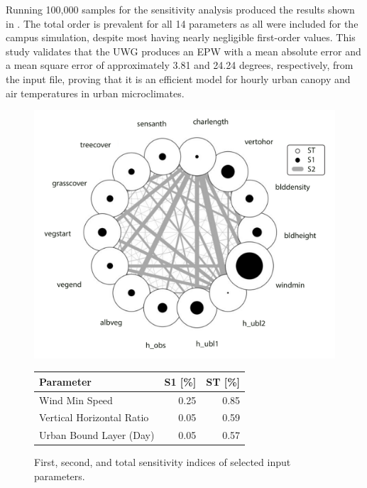 \documentclass[a4paper, 12pt]{article}
\begin{document}
Running 100,000 samples for the sensitivity analysis produced the results shown in . 
The total order is prevalent for all 14 parameters as all were included for the campus simulation, despite most having nearly negligible first-order values. 
This study validates that the UWG produces an EPW with a mean absolute error and a mean square error of approximately 3.81 and 24.24 degrees, respectively, from the input file, proving that it is an efficient model for hourly urban canopy and air temperatures in urban microclimates.

\begin{figure}[htb]
    \centering
    \begin{minipage}[b]{0.48\textwidth}
        \centering
        \includegraphics[width=\textwidth, trim = 0.5cm 0.5cm 0.5cm 0.5cm, clip = true]{UWG_Sensitivity.pdf}
        \caption{First, second, and total sensitivity indices of selected input parameters.}
        \label{fig:radial-plot}
    \end{minipage}
    \hfill
    \begin{minipage}[b]{0.48\textwidth}
        \centering
        \scriptsize
        \begin{tabular}{lrr}
        \toprule
        \textbf{Parameter} & \textbf{S1} [\%] & \textbf{ST} [\%] \\
        \midrule
        Wind Min Speed & 0.25 & 0.85 \\
        Vertical Horizontal Ratio & 0.05 & 0.59\\
        Urban Bound Layer (Day) & 0.05 & 0.57 \\

\end{tabular}
\end{minipage}
\end{figure}
\end{document}
